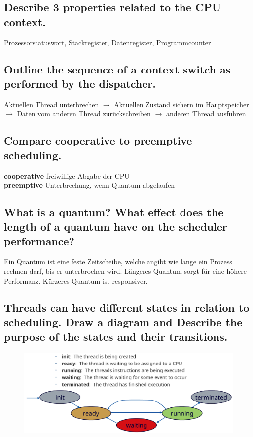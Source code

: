 \subsection{\important Describe 3 properties related to the CPU context.}
Prozessorstatuswort, Stackregister, Datenregister, Programmcounter

\subsection{Outline the sequence of a context switch as performed by the dispatcher.}
Aktuellen Thread unterbrechen $\rightarrow$ Aktuellen Zustand sichern im Hauptspeicher $\rightarrow$ Daten vom anderen Thread zur\"uckschreiben $\rightarrow$ anderen Thread ausf\"uhren

\subsection{Compare cooperative to preemptive scheduling.}
\textbf{cooperative} freiwillige Abgabe der CPU\\
\textbf{preemptive} Unterbrechung, wenn Quantum abgelaufen

\subsection{\important What is a quantum? What effect does the length of a quantum have on the scheduler performance?}
Ein Quantum ist eine feste Zeitscheibe, welche angibt wie lange ein Prozess rechnen darf, bis er unterbrochen wird. L\"angeres Quantum sorgt f\"ur eine h\"ohere Performanz. K\"urzeres Quantum ist responsiver.

\subsection{Threads can have different states in relation to scheduling. Draw a diagram and Describe the purpose of the states and their transitions.}

\begin{figure}[H]
	\centering
	\includegraphics[width=0.7\linewidth]{Pictures/scheduling_dia}
\end{figure}

